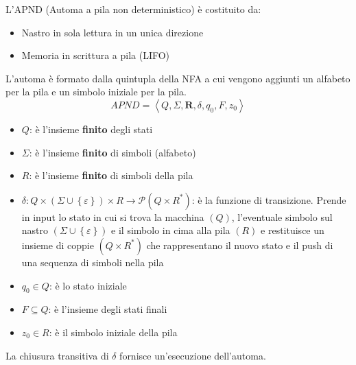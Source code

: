\documentclass[a4paper]{article}
\begin{document}
\begin{definition}
  L'APND (Automa a pila non deterministico) è costituito da:
  \begin{itemize}
    \item Nastro in sola lettura in un unica direzione
    \item Memoria in scrittura a pila (LIFO)
  \end{itemize}
  L'automa è formato dalla quintupla della NFA a cui vengono
  aggiunti un alfabeto per la pila e un simbolo iniziale per la pila.
  \[
    APND = \left< Q, \Sigma, \mathbf{R}, \delta, q_0, F, z_0 \right>
  \] 
  \begin{itemize}
    \item \( Q \): è l'insieme \textbf{finito} degli stati
    \item \( \Sigma \): è l'insieme \textbf{finito} di simboli (alfabeto)
    \item \( R \): è l'insieme \textbf{finito} di simboli della pila
    \item \( \delta: Q \times (\Sigma \cup \left\{ \varepsilon  \right\}) \times R
      \to \mathcal{P}(Q \times R^*) \): è la funzione di transizione. Prende in input
      lo stato in cui si trova la macchina \( (Q) \), l'eventuale simbolo sul nastro
      \( \left( \Sigma \cup \left\{ \varepsilon  \right\} \right) \) e il simbolo
      in cima alla pila \( (R) \) e restituisce un insieme di coppie
      \( (Q \times R^*) \) che rappresentano il nuovo stato e il push di una sequenza
      di simboli nella pila
    \item \( q_0 \in Q \): è lo stato iniziale
    \item \( F \subseteq Q \): è l'insieme degli stati finali
    \item \( z_0 \in R \): è il simbolo iniziale della pila
  \end{itemize}
  La chiusura transitiva di \( \delta \) fornisce un'esecuzione dell'automa.
\end{definition}
\end{document}
